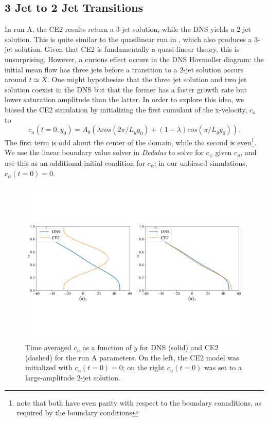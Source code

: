 \documentclass{jfm}
\begin{document}
\subsection{3 Jet to 2 Jet Transitions}
\label{sec:3->2}

In run A, the CE2 results return a 3-jet solution, while the DNS yields a 2-jet solution.
This is quite similar to the quasilinear run in \citet{2018RSPSA.47480422T}, which also produces a 3-jet solution.
Given that CE2 is fundamentally a quasi-linear theory, this is unsurprising.
However, a curious effect occurs in the DNS Hovmoller diagram:
the initial mean flow has three jets before a transition to a 2-jet solution occurs around $t \simeq X$.
One might hypothesize that the three jet solution and two jet solution coexist in the DNS but that the former has a faster growth rate but lower saturation amplitude than the latter.
In order to explore this idea, we biased the CE2 simulation by initializing the first cumulant of the x-velocity, $c_u$ to
\begin{equation}
  \label{eq:bias}
  c_u(t=0, y_0) = A_0 \left( \lambda cos(2\pi/L_y y_0) + (1-\lambda) cos (\pi/L_y y_0)\right).
\end{equation}
The first term is odd about the center of the domain, while the second is even\footnote{note that both have even parity with respect to the boundary connditions, as required by the boundary conditions}.
We use the linear boundary value solver in \emph{Dedalus} to solve for $c_\psi$ given $c_u$, and use this as an additional initial condition for $c_\psi$; in our unbiased simulations, $c_\psi(t=0) = 0$.
\begin{figure}
  \centering
  \includegraphics[width=\textwidth]{../../figs/umean_dns_ce2_runA_I.pdf}
  \caption{Time averaged $c_u$ as a function of $y$ for DNS (solid) and CE2 (dashed) for the run A parameters. On the left, the CE2 model was initialized with $c_u(t=0) = 0$; on the right $c_u(t=0)$ was set to a large-amplitude 2-jet solution.}
  \label{fig:cu_vs_y_runA}
\end{figure}
\end{document}
